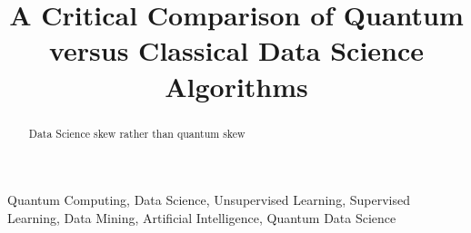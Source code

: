 \documentclass[conference]{IEEEtran}
\begin{document}
\title{A Critical Comparison of Quantum versus Classical Data Science
Algorithms\\


}

\author{


}

\maketitle

\begin{abstract}
Data Science skew rather than quantum skew
\end{abstract}

\begin{IEEEkeywords}
Quantum Computing, Data Science, Unsupervised Learning, Supervised Learning, Data Mining, Artificial Intelligence, Quantum Data Science 
\end{IEEEkeywords}
\end{document}

